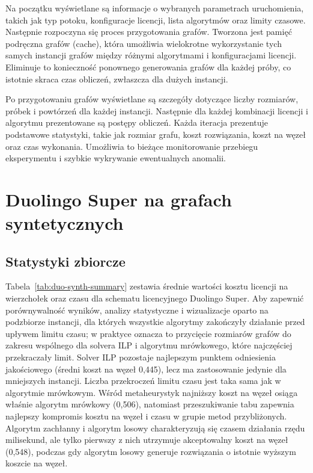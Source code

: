 Na początku wyświetlane są informacje o wybranych parametrach uruchomienia, takich jak typ potoku, konfiguracje licencji, lista algorytmów oraz limity czasowe. Następnie rozpoczyna się proces przygotowania grafów. Tworzona jest pamięć podręczna grafów (cache), która umożliwia wielokrotne wykorzystanie tych samych instancji grafów między różnymi algorytmami i konfiguracjami licencji. Eliminuje to konieczność ponownego generowania grafów dla każdej próby, co istotnie skraca czas obliczeń, zwłaszcza dla dużych instancji.

Po przygotowaniu grafów wyświetlane są szczegóły dotyczące liczby rozmiarów, próbek i powtórzeń dla każdej instancji. Następnie dla każdej kombinacji licencji i algorytmu prezentowane są postępy obliczeń. Każda iteracja prezentuje podstawowe statystyki, takie jak rozmiar grafu, koszt rozwiązania, koszt na węzeł oraz czas wykonania. Umożliwia to bieżące monitorowanie przebiegu eksperymentu i szybkie wykrywanie ewentualnych anomalii.

\section{Duolingo Super na grafach syntetycznych}

\subsection{Statystyki zbiorcze}
Tabela~\ref{tab:duo-synth-summary} zestawia średnie wartości kosztu licencji na wierzchołek oraz czasu dla schematu licencyjnego Duolingo Super. Aby zapewnić porównywalność wyników, analizy statystyczne i wizualizacje oparto na podzbiorze instancji, dla których wszystkie algorytmy zakończyły działanie przed upływem limitu czasu; w praktyce oznacza to przycięcie rozmiarów grafów do zakresu wspólnego dla solvera ILP i algorytmu mrówkowego, które najczęściej przekraczały limit. Solver ILP pozostaje najlepszym punktem odniesienia jakościowego (średni koszt na węzeł 0{,}445), lecz ma zastosowanie jedynie dla mniejszych instancji. Liczba przekroczeń limitu czasu jest taka sama jak w algorytmie mrówkowym. Wśród metaheurystyk najniższy koszt na węzeł osiąga właśnie algorytm mrówkowy (0{,}506), natomiast przeszukiwanie tabu zapewnia najlepszy kompromis kosztu na węzeł i czasu w grupie metod przybliżonych. Algorytm zachłanny i algorytm losowy charakteryzują się czasem działania rzędu milisekund, ale tylko pierwszy z nich utrzymuje akceptowalny koszt na węzeł (0{,}548), podczas gdy algorytm losowy generuje rozwiązania o istotnie wyższym koszcie na węzeł.

